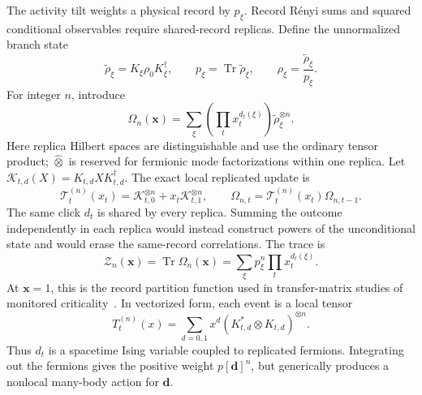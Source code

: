 \documentclass[
  aps,prx,twocolumn,superscriptaddress,longbibliography,
  nofootinbib,floatfix
]{revtex4-2}
\newcommand{\Tr}{\operatorname{Tr}}
\newcommand{\cK}{\mathcal{K}}
\newcommand{\cT}{\mathcal{T}}
\newcommand{\cZ}{\mathcal{Z}}
\theoremstyle{plain}
\theoremstyle{definition}
\begin{document}
The activity tilt weights a physical record by \(p_\xi\).  Record R\'enyi sums
and squared conditional observables require shared-record replicas.  Define
the unnormalized branch state
\begin{equation}
 \widetilde\rho_\xi=K_\xi\rho_0K_\xi^\dagger,
 \qquad
 p_\xi=\Tr\widetilde\rho_\xi,
 \qquad
 \rho_\xi=\frac{\widetilde\rho_\xi}{p_\xi}.
 \label{eq:unnormalized-branch}
\end{equation}
For integer \(n\), introduce
\begin{equation}
 \Omega_n(\bm x)
 =\sum_\xi\left(\prod_tx_t^{d_t(\xi)}\right)
 \widetilde\rho_\xi^{\otimes n}.
 \label{eq:Omega-n-definition}
\end{equation}
Here replica Hilbert spaces are distinguishable and use the ordinary tensor
product; \(\widehat\otimes\) is reserved for fermionic mode factorizations
within one replica.
Let \(\cK_{t,d}(X)=K_{t,d}XK_{t,d}^\dagger\).  The exact local replicated
update is
\begin{equation}
 \boxed{
 \cT_{t}^{(n)}(x_t)
 =\cK_{t,0}^{\otimes n}+x_t\cK_{t,1}^{\otimes n},
 \qquad
 \Omega_{n,t}=\cT_t^{(n)}(x_t)\Omega_{n,t-1}.}
 \label{eq:replicated-local-transfer}
\end{equation}
The same click \(d_t\) is shared by every replica.  Summing the outcome
independently in each replica would instead construct powers of the
unconditional state and would erase the same-record correlations.  The trace
is
\begin{equation}
 \boxed{
 \cZ_n(\bm x)=\Tr\Omega_n(\bm x)
 =\sum_\xi p_\xi^n\prod_tx_t^{d_t(\xi)}.}
 \label{eq:replicated-partition-function}
\end{equation}
At \(\bm x=1\), this is the record partition function used in transfer-matrix
studies of monitored criticality~\cite{JianYouVasseur2020,BaoChoiAltman2020,
Zabalo2022}.  In vectorized form, each event is a local tensor
\begin{equation}
 T_t^{(n)}(x)
 =\sum_{d=0,1}x^d
 \left(K_{t,d}^*\otimes K_{t,d}\right)^{\otimes n}.
 \label{eq:vectorized-replica-tensor}
\end{equation}
Thus \(d_t\) is a spacetime Ising variable coupled to replicated fermions.
Integrating out the fermions gives the positive weight \(p[\bm d]^n\), but
generically produces a nonlocal many-body action for \(\bm d\).
\end{document}
